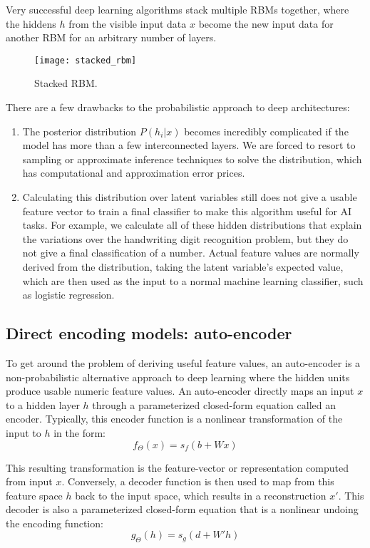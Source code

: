 Very successful deep learning algorithms stack multiple RBMs together, where the hiddens \(h\) from the visible input data \(x\) become the new input data for another RBM for an arbitrary number of layers. 

\begin{figure}[h!]
  \centering
    \texttt{[image: stacked\_rbm]}
\caption{Stacked RBM.}
\end{figure}

There are a few drawbacks to the probabilistic approach to deep architectures:
\begin{enumerate}
\item The posterior distribution \(P(h_i | x)\) becomes incredibly complicated if the model has more than a few interconnected layers. We are forced to resort to sampling or approximate inference techniques to solve the distribution, which has computational and approximation error prices.
\item Calculating this distribution over latent variables still does not give a usable feature vector to train a final classifier to make this algorithm useful for AI tasks. For example, we calculate all of these hidden distributions that explain the variations over the handwriting digit recognition problem, but they do not give a final classification of a number. Actual feature values are normally derived from the distribution, taking the latent variable's expected value, which are then used as the input to a normal machine learning classifier, such as logistic regression.
\end{enumerate}

\subsection{Direct encoding models: auto-encoder}
To get around the problem of deriving useful feature values, an auto-encoder is a non-probabilistic alternative approach to deep learning where the hidden units produce usable numeric feature values. An auto-encoder directly maps an input \(x\) to a hidden layer \(h\) through a parameterized closed-form equation called an encoder. Typically, this encoder function is a nonlinear transformation of the input to \(h\) in the form:
\[f_\Theta (x) = s_f (b + Wx)\]

This resulting transformation is the feature-vector or representation computed from input \(x\).
Conversely, a decoder function is then used to map from this feature space \(h\) back to the input space, which results in a reconstruction \(x'\). This decoder is also a parameterized closed-form equation that is a nonlinear undoing the encoding function:
\[g_\Theta (h) = s_g (d + W' h)\]

